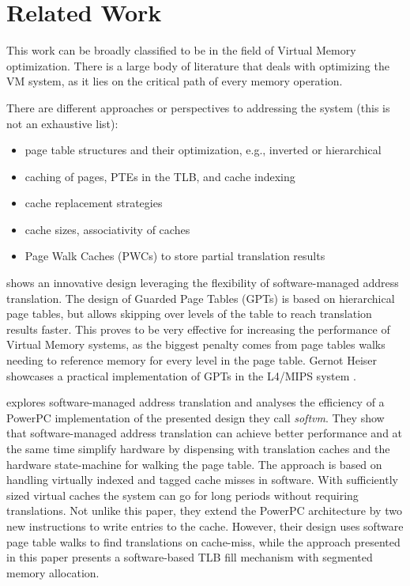 \chapter{Related Work}

\label{chap:related}
This work can be broadly classified to be in the field of Virtual Memory optimization. There is a large body of literature that deals with optimizing the VM system, as it lies on the critical path of every memory operation.

There are different approaches or perspectives to addressing the system (this is not an exhaustive list):

\begin{itemize}
    \item page table structures and their optimization, e.g., inverted or hierarchical
    \item caching of pages, PTEs in the TLB, and cache indexing
    \item cache replacement strategies
    \item cache sizes, associativity of caches
    \item Page Walk Caches (PWCs) to store partial translation results
\end{itemize}



\textbf{\cite{liedtkeGPT}} shows an innovative design leveraging the flexibility of software-managed
address translation.
The design of Guarded Page Tables (GPTs) is based on hierarchical page tables, but allows skipping over levels of the table to reach translation results faster.
This proves to be very effective for increasing the performance of Virtual Memory systems, as the biggest penalty comes from page tables walks needing to reference memory for every level in the page table.
Gernot Heiser showcases a practical implementation of GPTs in the L4/MIPS system \cite{heiserAnatomyHighPerformanceMicrokernel}.




\textbf{\cite{jacobSoftwaremanagedAddressTranslation1997}} explores software-managed address translation and analyses the efficiency of a PowerPC implementation
of the presented design they call \textit{softvm}. They show that
software-managed address translation can achieve better performance and
at the same time simplify hardware by dispensing with translation caches and
the hardware state-machine for walking the page table.
The approach is based on handling virtually indexed and tagged cache misses in
software.
With sufficiently sized virtual caches the system can go for long periods
without requiring translations.
Not unlike this paper, they extend the PowerPC architecture by two new instructions
to write entries to the cache. However, their design uses software page table
walks to find translations on cache-miss, while the approach presented in this
paper presents a software-based TLB fill mechanism with segmented
memory allocation.

